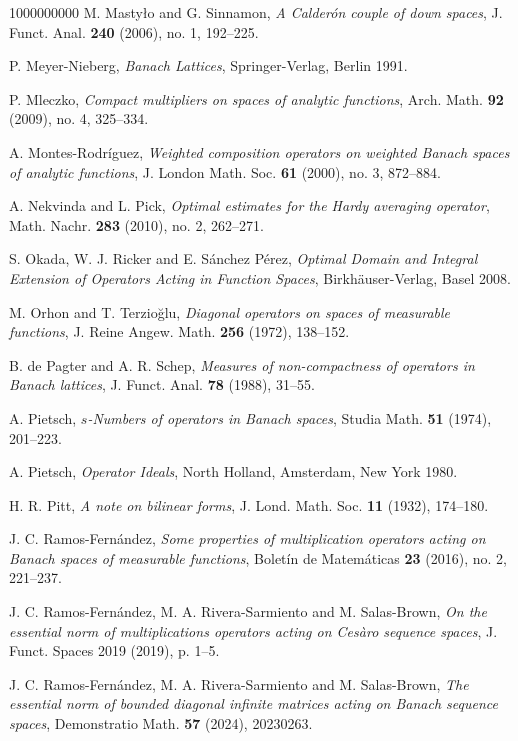 \documentclass[11pt]{amsart}
\theoremstyle{definition}
\theoremstyle{definition}
\theoremstyle{definition}
\theoremstyle{definition}
\theoremstyle{definition}
\theoremstyle{definition}
\theoremstyle{definition}
\theoremstyle{definition}
\numberwithin{equation}{section}
\numberwithin{equation}{section}
\numberwithin{equation}{section}
\theoremstyle{definition}
\theoremstyle{definition}
\theoremstyle{definition}
\theoremstyle{definition}
\theoremstyle{definition}
\theoremstyle{definition}
\begin{document}
\begin{thebibliography}{1000000000}
	 M. Masty{\l}o and G. Sinnamon, {\it A Calder{\' o}n couple of down spaces}, J. Funct. Anal. {\bf 240} (2006), no. 1, 192--225.
	
	 P. Meyer-Nieberg, {\it Banach Lattices}, Springer-Verlag, Berlin 1991.
	
	 P. Mleczko, {\it Compact multipliers on spaces of analytic functions}, Arch. Math. {\bf 92} (2009), no. 4, 325--334.
	
	 A. Montes-Rodr{\' i}guez, {\it Weighted composition operators on weighted Banach spaces of analytic functions}, J. London Math. Soc. {\bf 61} (2000), no. 3, 872--884.
	
	 A. Nekvinda and L. Pick, {\it Optimal estimates for the Hardy averaging operator}, Math. Nachr. {\bf 283} (2010), no. 2, 262--271.
	
	 S. Okada, W. J. Ricker and E. S\'anchez P\'erez, \textit{Optimal Domain and Integral Extension of Operators Acting in Function Spaces},
		Birkh{\" a}user-Verlag, Basel 2008.
		
	 M. Orhon and T. Terzio{\u g}lu, {\it Diagonal operators on spaces of measurable functions}, J. Reine Angew. Math. {\bf 256} (1972), 138--152.
		
	 B. de Pagter and A. R. Schep, {\it Measures of non-compactness of operators in Banach lattices}, J. Funct. Anal. {\bf 78} (1988), 31--55.
	
	 A. Pietsch, {\it $s$-Numbers of operators in Banach spaces}, Studia Math. {\bf 51} (1974), 201--223.
	
	 A. Pietsch, {\it Operator Ideals}, North Holland, Amsterdam, New York 1980.
	
	 H. R. Pitt, {\it A note on bilinear forms}, J. Lond. Math. Soc. {\bf 11} (1932), 174--180.
	
	 J. C. Ramos-Fern{\' a}ndez, {\it Some properties of multiplication operators acting on Banach spaces of measurable functions},
		Bolet{\' i}n de Matem{\' a}ticas {\bf 23} (2016), no. 2, 221--237.
	
	 J. C. Ramos-Fern{\' a}ndez, M. A. Rivera-Sarmiento and M. Salas-Brown, {\it On the essential norm of multiplications
		operators acting on Ces{\` a}ro sequence spaces}, J. Funct. Spaces 2019 (2019), p. 1--5.
	
	 J. C. Ramos-Fern{\' a}ndez, M. A. Rivera-Sarmiento and M. Salas-Brown, {\it The essential norm of bounded diagonal infinite
	matrices acting on Banach sequence spaces}, Demonstratio Math. {\bf 57} (2024), 20230263.
	

\end{thebibliography}
\end{document}
